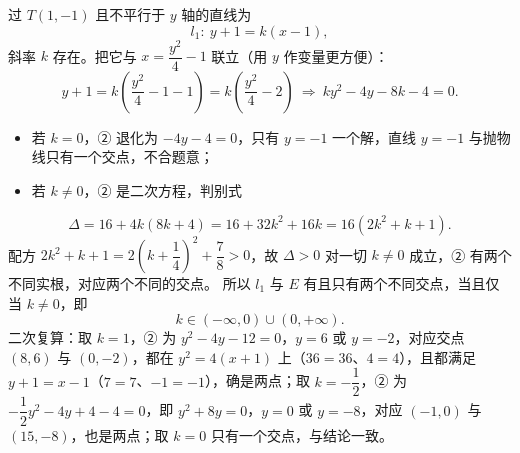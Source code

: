\begin{answer}
过 $T(1,-1)$ 且不平行于 $y$ 轴的直线为
\nopagebreak[4]
\[
l_1:\ y+1=k(x-1),
\]
斜率 $k$ 存在。把它与 $x=\dfrac{y^2}{4}-1$ 联立（用 $y$ 作变量更方便）：
\nopagebreak[4]
\[
y+1=k\left(\frac{y^2}{4}-1-1\right)=k\left(\frac{y^2}{4}-2\right)
\ \Longrightarrow\ ky^2-4y-8k-4=0.\tag{②}
\]
\begin{itemize}
\item 若 $k=0$，② 退化为 $-4y-4=0$，只有 $y=-1$ 一个解，直线 $y=-1$ 与抛物线只有一个交点，不合题意；
\item 若 $k\neq0$，② 是二次方程，判别式
\end{itemize}
\nopagebreak[4]
\[
\Delta=16+4k(8k+4)=16+32k^2+16k=16\left(2k^2+k+1\right).
\]
配方 $2k^2+k+1=2\left(k+\dfrac14\right)^2+\dfrac78>0$，故 $\Delta>0$ 对一切 $k\neq0$ 成立，② 有两个不同实根，对应两个不同的交点。
所以 $l_1$ 与 $E$ 有且只有两个不同交点，当且仅当 $k\neq0$，即
\nopagebreak[4]
\[
k\in(-\infty,0)\cup(0,+\infty).
\]
二次复算：取 $k=1$，② 为 $y^2-4y-12=0$，$y=6$ 或 $y=-2$，对应交点 $(8,6)$ 与 $(0,-2)$，都在 $y^2=4(x+1)$ 上（$36=36$、$4=4$），且都满足 $y+1=x-1$（$7=7$、$-1=-1$），确是两点；取 $k=-\dfrac12$，② 为 $-\dfrac12y^2-4y+4-4=0$，即 $y^2+8y=0$，$y=0$ 或 $y=-8$，对应 $(-1,0)$ 与 $(15,-8)$，也是两点；取 $k=0$ 只有一个交点，与结论一致。




\end{answer}